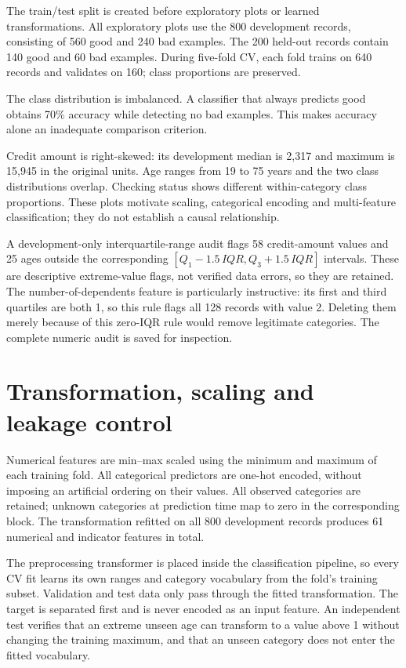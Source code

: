 The train/test split is created before exploratory plots or learned transformations. All exploratory plots use the 800 development records, consisting of 560 good and 240 bad examples. The 200 held-out records contain 140 good and 60 bad examples. During five-fold CV, each fold trains on 640 records and validates on 160; class proportions are preserved.

The class distribution is imbalanced. A classifier that always predicts good obtains 70\% accuracy while detecting no bad examples. This makes accuracy alone an inadequate comparison criterion.

Credit amount is right-skewed: its development median is 2,317 and maximum is 15,945 in the original units. Age ranges from 19 to 75 years and the two class distributions overlap. Checking status shows different within-category class proportions. These plots motivate scaling, categorical encoding and multi-feature classification; they do not establish a causal relationship.

A development-only interquartile-range audit flags 58 credit-amount values and 25 ages outside the corresponding $[Q_1-1.5\,IQR,Q_3+1.5\,IQR]$ intervals. These are descriptive extreme-value flags, not verified data errors, so they are retained. The number-of-dependents feature is particularly instructive: its first and third quartiles are both 1, so this rule flags all 128 records with value 2. Deleting them merely because of this zero-IQR rule would remove legitimate categories. The complete numeric audit is saved for inspection.


\section{Transformation, scaling and leakage control}
Numerical features are min--max scaled using the minimum and maximum of each training fold. All categorical predictors are one-hot encoded, without imposing an artificial ordering on their values. All observed categories are retained; unknown categories at prediction time map to zero in the corresponding block. The transformation refitted on all 800 development records produces 61 numerical and indicator features in total.

The preprocessing transformer is placed inside the classification pipeline, so every CV fit learns its own ranges and category vocabulary from the fold's training subset. Validation and test data only pass through the fitted transformation. The target is separated first and is never encoded as an input feature. An independent test verifies that an extreme unseen age can transform to a value above 1 without changing the training maximum, and that an unseen category does not enter the fitted vocabulary.

